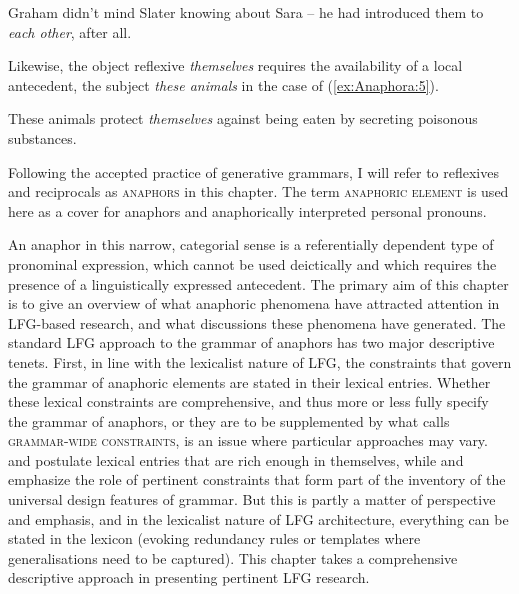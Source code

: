 \documentclass[output=paper,hidelinks]{langscibook}
\begin{document}
\ea\label{ex:Anaphora:4} Graham didn't mind Slater knowing about Sara – he had  introduced them to \emph{each other}, after all.
\z

\noindent Likewise, the object reflexive \emph{themselves} requires the availability of a local antecedent, the subject \emph{these animals} in the case of (\ref{ex:Anaphora:5}).

\ea\label{ex:Anaphora:5} These animals protect \emph{themselves} against being eaten by  secreting poisonous substances.
\z

\noindent Following the accepted practice of generative grammars, I will refer to reflexives and reciprocals as \textsc{anaphors} in this chapter. The term \textsc{anaphoric element} is used here as a cover for anaphors and anaphorically interpreted personal pronouns.

An anaphor in this narrow, categorial sense is a referentially dependent type of pronominal expression, which cannot be used deictically and which requires the presence of a linguistically expressed antecedent. The primary aim of this chapter is to give an overview of what anaphoric phenomena have attracted attention in LFG-based research, and what discussions these phenomena have generated. The standard LFG approach to the grammar of anaphors has two major descriptive tenets. First, in line with the lexicalist nature of LFG, the constraints that govern the grammar of anaphoric elements are stated in their lexical entries. Whether these lexical constraints are comprehensive, and thus more or less fully specify the grammar of anaphors, or they are to be supplemented by what  calls \textsc{grammar-wide constraints}, is an issue where particular approaches may vary. \citet{dalrymple1993,dalrymple01} and \citet{DLM:LFG} postulate lexical entries that are rich enough in themselves, while \citet{bresnan2001lexical} and \citet{BresnanEtAl2016} emphasize the role of pertinent constraints that form part of the inventory of the universal design features of grammar. But this is partly a matter of perspective and emphasis, and in the lexicalist nature of LFG architecture, everything can be stated in the lexicon (evoking redundancy rules or templates where generalisations need to be captured). This chapter takes a comprehensive descriptive approach in presenting pertinent LFG research.
\end{document}
